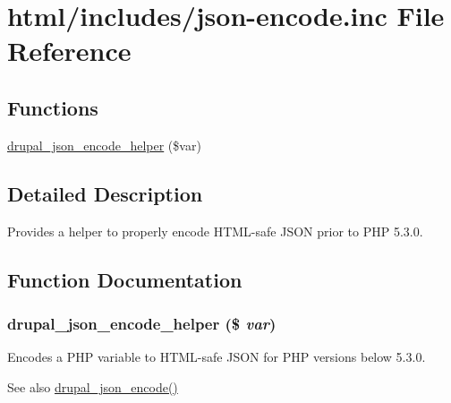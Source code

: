 \hypertarget{json-encode_8inc}{
\section{html/includes/json-\/encode.inc File Reference}
\label{json-encode_8inc}
}
\subsection*{Functions}
\begin{DoxyCompactItemize}
\item 
\hyperlink{json-encode_8inc_a96f15d8dc7b543c3f7568ed07f592ff3}{drupal\_\-json\_\-encode\_\-helper} (\$var)
\end{DoxyCompactItemize}


\subsection{Detailed Description}
Provides a helper to properly encode HTML-\/safe JSON prior to PHP 5.3.0. 

\subsection{Function Documentation}
\hypertarget{json-encode_8inc_a96f15d8dc7b543c3f7568ed07f592ff3}{
\subsubsection[{drupal\_\-json\_\-encode\_\-helper}]{\setlength{\rightskip}{0pt plus 5cm}drupal\_\-json\_\-encode\_\-helper (\$ {\em var})}}
\label{json-encode_8inc_a96f15d8dc7b543c3f7568ed07f592ff3}
Encodes a PHP variable to HTML-\/safe JSON for PHP versions below 5.3.0.

\begin{DoxySeeAlso}{See also}
\hyperlink{group__php__wrappers_gaf09c80fb758b9f3657772e26817e37b9}{drupal\_\-json\_\-encode()} 
\end{DoxySeeAlso}
